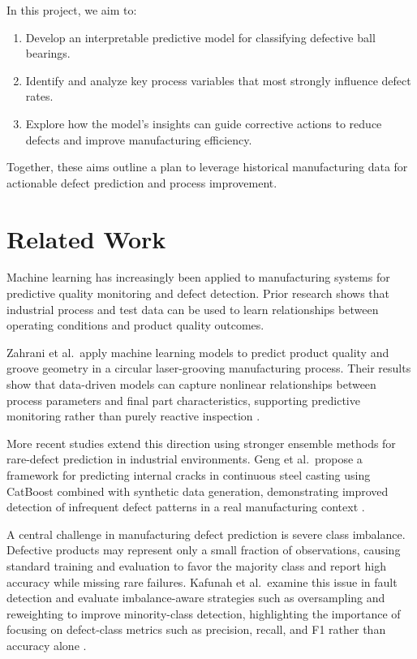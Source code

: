 \documentclass{article}
\begin{document}
In this project, we aim to:

\begin{enumerate}
    \item Develop an interpretable predictive model for classifying defective ball bearings.
    \item Identify and analyze key process variables that most strongly influence defect rates.
    \item Explore how the model’s insights can guide corrective actions to reduce defects and improve manufacturing efficiency.
\end{enumerate}

Together, these aims outline a plan to leverage historical manufacturing data for 
actionable defect prediction and process improvement.


\section{Related Work}
Machine learning has increasingly been applied to manufacturing systems for predictive quality monitoring and defect detection. Prior research shows that industrial process and test data can be used to learn relationships between operating conditions and product quality outcomes.

Zahrani et al.\ apply machine learning models to predict product quality and groove geometry in a circular laser-grooving manufacturing process. Their results show that data-driven models can capture nonlinear relationships between process parameters and final part characteristics, supporting predictive monitoring rather than purely reactive inspection \cite{zahrani2020lasergrooving}.

More recent studies extend this direction using stronger ensemble methods for rare-defect prediction in industrial environments. Geng et al.\ propose a framework for predicting internal cracks in continuous steel casting using CatBoost combined with synthetic data generation, demonstrating improved detection of infrequent defect patterns in a real manufacturing context \cite{geng2025ctgan}.

A central challenge in manufacturing defect prediction is severe class imbalance. Defective products may represent only a small fraction of observations, causing standard training and evaluation to favor the majority class and report high accuracy while missing rare failures. Kafunah et al.\ examine this issue in fault detection and evaluate imbalance-aware strategies such as oversampling and reweighting to improve minority-class detection, highlighting the importance of focusing on defect-class metrics such as precision, recall, and F1 rather than accuracy alone \cite{kafunah2021imbalanced}.
\end{document}

